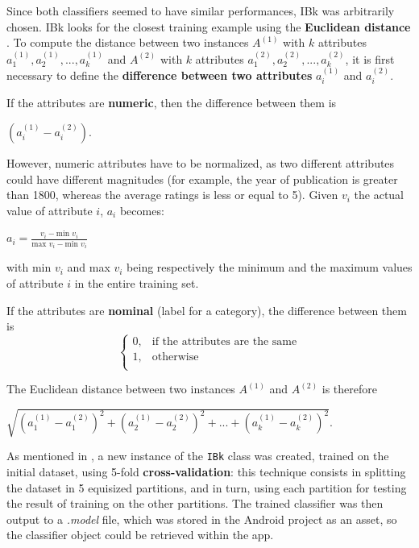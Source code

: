 \documentclass{mproj}
\begin{document}
Since both classifiers seemed to have similar performances, IBk was arbitrarily chosen. IBk looks for the closest training example using the \textbf{Euclidean distance} \cite[Chapter~11]{wekabook}. To compute the distance between two instances $A^{(1)}$ with $k$ attributes $a_1^{(1)}, a_2^{(1)}, ..., a_k^{(1)}$ and $A^{(2)}$ with $k$ attributes $a_1^{(2)}, a_2^{(2)}, ..., a_k^{(2)}$, it is first necessary to define the \textbf{difference between two attributes} $a_i^{(1)}$ and $a_i^{(2)}$. \cite[Chapter~4]{wekabook}

If the attributes are \textbf{numeric}, then the difference between them is 
\begin{center}
	\vspace{-5mm}
	$(a_i^{(1)} - a_i^{(2)})$.
\end{center}

However, numeric attributes have to be normalized, as two different attributes could have different magnitudes (for example, the year of publication is greater than 1800, whereas the average ratings is less or equal to 5). Given $v_i$ the actual value of attribute $i$, $a_i$ becomes:
\begin{center}
	\vspace{-5mm}
	$a_i = \frac{v_i - \text{min } v_i}{\text{max } v_i - \text{min } v_i}$
\end{center}
with min $v_i$ and max $v_i$ being respectively the minimum and the maximum values of attribute $i$ in the entire training set. 

If the attributes are \textbf{nominal} (label for a category), the difference between them is
\begin{equation}
	\begin{cases}
		0, & \text{if the attributes are the same}\\
		1, & \text{otherwise}\\
	\end{cases}
\end{equation}

The Euclidean distance between two instances $A^{(1)}$ and $A^{(2)}$ is therefore
\begin{center}
	$\sqrt{(a_1^{(1)} - a_1^{(2)})^2 + (a_2^{(1)} - a_2^{(2)})^2 + ... + (a_k^{(1)} - a_k^{(2)})^2}$.
\end{center}

As mentioned in , a new instance of the \verb|IBk| class was created, trained on the initial dataset, using 5-fold \textbf{cross-validation}: this technique consists in splitting the dataset in 5 equisized partitions, and in turn, using each partition for testing the result of training on the other partitions. \cite[Chapter~5]{wekabook} The trained classifier was then output to a \textit{.model} file, which was stored in the Android project as an asset, so the classifier object could be retrieved within the app.
\end{document}
